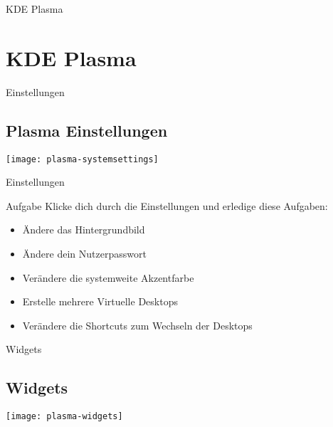 
\begin{frame}{KDE Plasma}
    \section{KDE Plasma}\label{sec:KDE-Plasma}
\end{frame}

\begin{frame}{Einstellungen}
    \subsection{Plasma Einstellungen}\label{subsec:plasma-einstellungen}
    \texttt{[image: plasma-systemsettings]}
\end{frame}

\begin{frame}{Einstellungen}

    \vspace{0.5cm}
    \begin{alertblock}{Aufgabe}
        Klicke dich durch die Einstellungen und erledige diese Aufgaben:

        \pause
        \begin{itemize}
            \item Ändere das Hintergrundbild\pause
            \item Ändere dein Nutzerpasswort\pause
            \item Verändere die systemweite Akzentfarbe\pause
            \item Erstelle mehrere Virtuelle Desktops\pause
            \item Verändere die Shortcuts zum Wechseln der Desktops
        \end{itemize}
    \end{alertblock}
\end{frame}

\begin{frame}{Widgets}
    \subsection{Widgets}\label{subsec:widgets}
    \texttt{[image: plasma-widgets]}
\end{frame}

